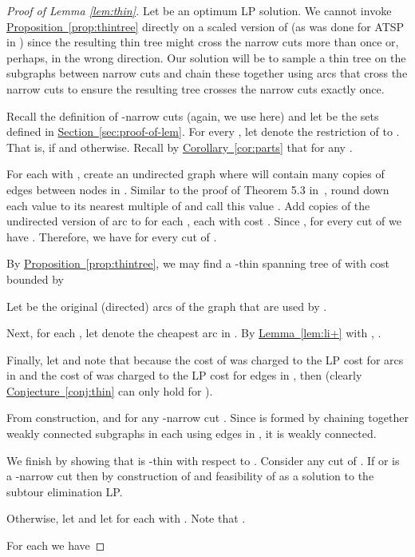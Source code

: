 \documentclass[11pt]{article}
\newcommand{\lref}[2][]{\hyperref[#2]{#1~\ref*{#2}}}
\theoremstyle{definition}
\newcounter{note}[section]
\begin{document}
\begin{proof}[Proof of Lemma \ref{lem:thin}]
Let  be an optimum LP solution. We cannot invoke \lref[Proposition]{prop:thintree} directly on a scaled version of 
(as was done for ATSP in \cite{GS11}) since the resulting thin tree might cross the narrow cuts more than once or, perhaps, in the wrong direction.
Our solution will be to sample a thin tree on the subgraphs between narrow cuts and chain these together using arcs that cross the narrow cuts
to ensure the resulting tree crosses the narrow cuts exactly once.

Recall the definition of -narrow cuts (again, we use  here)
and let  be the sets defined in \lref[Section]{sec:proof-of-lem}.
For every , let  denote the restriction of  to . That is,  if  and  otherwise.
Recall by \lref[Corollary]{cor:parts} that  for any .

For each  with , create an undirected graph  where  will contain many copies of edges between nodes in .
Similar to the proof of Theorem 5.3 in~\cite{GS11}, round down each  value to its nearest multiple of  and call this value .
Add  copies of the undirected version of arc  to  for each , each with cost .
Since , for every cut  of  we have .
Therefore, we have  for every cut  of .

By \lref[Proposition]{prop:thintree}, we may find a -thin spanning tree  of  with cost bounded by

Let  be the original (directed) arcs of the graph  that are used by .

Next, for each , let  denote the cheapest arc in . By \lref[Lemma]{lem:li+}
with , .

Finally, let  and note that because the cost of  was
charged to the LP cost for arcs in  and the cost of  was charged to the LP cost for edges in , then
 (clearly \lref[Conjecture]{conj:thin} can only hold for ).

From construction,  and  for any -narrow cut .
Since  is formed by chaining together weakly connected subgraphs in each  using edges in , it is weakly connected.

We finish by showing that  is -thin with respect to . Consider any cut  of .
If  or  is a -narrow cut then  by construction of  and feasibility of  as a solution to the subtour elimination LP.

Otherwise, let  and let  for each  with .
Note that .

For each  we have



\end{proof}
\end{document}
